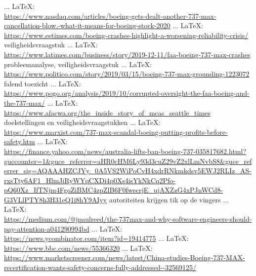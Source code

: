 \begin{thebibliography}{99}
 ... \LaTeX:\\ \url{https://www.nasdaq.com/articles/boeing-gets-dealt-another-737-max-cancellation-blow.-what-it-means-for-boeing-stock-2020}
 ... \LaTeX:\\ \url{https://www.eetimes.com/boeing-crashes-highlight-a-worsening-reliability-crisis/}
veiligheidsvraagstuk
 ... \LaTeX:\\ \url{https://www.latimes.com/business/story/2019-12-11/faa-boeing-737-max-crashes}
probleemanalyse, veiligheidsvraagstuk
 ... \LaTeX:\\ \url{https://www.politico.com/story/2019/03/15/boeing-737-max-grounding-1223072}
falend toezicht
 ... \LaTeX:\\ \url{https://www.pogo.org/analysis/2019/10/corrupted-oversight-the-faa-boeing-and-the-737-max/}
 ... \LaTeX:\\ \url{https://www.afacwa.org/the_inside_story_of_mcas_seattle_times}
doelstellingen en veiligheidsvraagstukken
 ... \LaTeX:\\ \url{https://www.marxist.com/737-max-scandal-boeing-putting-profits-before-safety.htm}
 ... \LaTeX:\\ \url{https://finance.yahoo.com/news/australia-lifts-ban-boeing-737-035817682.html?guccounter=1&guce_referrer=aHR0cHM6Ly93d3cuZ29vZ2xlLmNvbS8&guce_referrer_sig=AQAAAHZCJYy_0A5VS2WiPoCvH4xdrRNkmkdsv5EWJ2RLIz_AS-rxsTty6AF1_HlmJiRyWYqCXDi4p0Xs4isYkNkCq2Pfo-pQ60Xz_IfTNjm4FgoZiBMC4zpZlB6F0fwecrjE_ujAXZzG4xPJnWCd8-G3VLlPTY8h3H31eQ1i8hY9AIyy}
autoriteiten krijgen tik op de vingers
 ... \LaTeX:\\ \url{https://medium.com/@jpaulreed/the-737max-and-why-software-engineers-should-pay-attention-a041290994bd}
 ... \LaTeX:\\ \url{https://news.ycombinator.com/item?id=19414775}
 ... \LaTeX:\\ \url{https://www.bbc.com/news/55366320}
 ... \LaTeX:\\ \url{https://www.marketscreener.com/news/latest/China-studies-Boeing-737-MAX-recertification-wants-safety-concerns-fully-addressed--32569125/}

\end{thebibliography}
